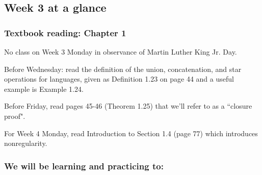 

\subsection*{Week 3 at a glance}


\subsubsection*{Textbook reading: Chapter 1}

\vspace{-15pt}

No class on Week 3 Monday in observance of Martin Luther King Jr. Day.

Before Wednesday: read the definition of the union, concatenation, and star operations for languages,  given 
as Definition 1.23 on page 44 and a useful example is Example 1.24.

Before Friday,  read pages 45-46 (Theorem 1.25) that we'll refer to as a ``closure proof".

For Week 4 Monday, read Introduction to Section 1.4 (page 77) which introduces nonregularity.


\vspace{-20pt}

\subsubsection*{We will be learning and practicing to:}

\vspace{-15pt}

